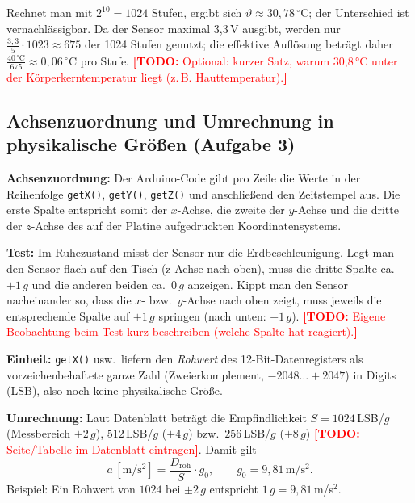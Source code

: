 \documentclass[a4paper,oneside,10pt]{article}
\newcommand{\todo}[1]{\textcolor{red}{\textbf{[TODO:} #1\textbf{]}}}
\begin{document}
Rechnet man mit $2^{10} = 1024$ Stufen, ergibt sich $\vartheta \approx 30{,}78\,^\circ$C;
der Unterschied ist vernachlässigbar. Da der Sensor maximal 3{,}3\,V ausgibt, werden
nur $\frac{3{,}3}{5}\cdot 1023 \approx 675$ der 1024 Stufen genutzt; die effektive
Auflösung beträgt daher $\frac{40\,^\circ\mathrm{C}}{675} \approx 0{,}06\,^\circ$C pro Stufe.
\todo{Optional: kurzer Satz, warum 30{,}8\,°C unter der Körperkerntemperatur liegt (z.\,B. Hauttemperatur).}

\subsection{Achsenzuordnung und Umrechnung in physikalische Größen (Aufgabe 3)}

\textbf{Achsenzuordnung:} Der Arduino-Code gibt pro Zeile die Werte in der
Reihenfolge \texttt{getX()}, \texttt{getY()}, \texttt{getZ()} und anschließend
den Zeitstempel aus. Die erste Spalte entspricht somit der $x$-Achse, die
zweite der $y$-Achse und die dritte der $z$-Achse des auf der Platine
aufgedruckten Koordinatensystems.

\textbf{Test:} Im Ruhezustand misst der Sensor nur die Erdbeschleunigung.
Legt man den Sensor flach auf den Tisch (z-Achse nach oben), muss die dritte
Spalte ca.\ $+1\,g$ und die anderen beiden ca.\ $0\,g$ anzeigen. Kippt man den
Sensor nacheinander so, dass die $x$- bzw.\ $y$-Achse nach oben zeigt, muss
jeweils die entsprechende Spalte auf $+1\,g$ springen (nach unten: $-1\,g$).
\todo{Eigene Beobachtung beim Test kurz beschreiben (welche Spalte hat reagiert).}

\textbf{Einheit:} \texttt{getX()} usw.\ liefern den \emph{Rohwert} des 12-Bit-Datenregisters
als vorzeichenbehaftete ganze Zahl (Zweierkomplement, $-2048 \ldots +2047$) in
Digits (LSB), also noch keine physikalische Größe.

\textbf{Umrechnung:} Laut Datenblatt \cite{mma8452q} beträgt die Empfindlichkeit
$S = 1024$\,LSB/$g$ (Messbereich $\pm 2\,g$), $512$\,LSB/$g$ ($\pm 4\,g$) bzw.\
$256$\,LSB/$g$ ($\pm 8\,g$) \todo{Seite/Tabelle im Datenblatt eintragen}.
Damit gilt
\begin{equation}
  a\,[\mathrm{m/s^2}] = \frac{D_\mathrm{roh}}{S}\cdot g_0, \qquad g_0 = 9{,}81\,\mathrm{m/s^2}.
  \label{eq:umrechnung}
\end{equation}
Beispiel: Ein Rohwert von $1024$ bei $\pm 2\,g$ entspricht $1\,g = 9{,}81$\,m/s$^2$.

\end{document}

